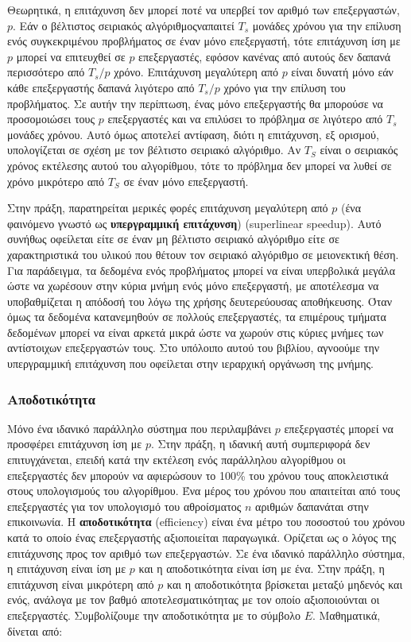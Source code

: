 \documentclass[12pt,a4paper]{article} %
\begin{document}
Θεωρητικά, η επιτάχυνση δεν μπορεί ποτέ να υπερβεί τον αριθμό των 
επεξεργαστών, $p$. Εάν ο βέλτιστος σειριακός αλγόριθμοςναπαιτεί $T_s$ 
μονάδες χρόνου για την επίλυση ενός συγκεκριμένου προβλήματος σε έναν 
μόνο επεξεργαστή, τότε επιτάχυνση ίση με $p$ μπορεί να επιτευχθεί σε $p$ 
επεξεργαστές, εφόσον κανένας από αυτούς δεν δαπανά περισσότερο από $T_s/p$ 
χρόνο. Επιτάχυνση μεγαλύτερη από $p$ είναι δυνατή μόνο εάν κάθε 
επεξεργαστής δαπανά λιγότερο από $T_s/p$ χρόνο για την επίλυση του 
προβλήματος. Σε αυτήν την περίπτωση, ένας μόνο επεξεργαστής θα μπορούσε 
να προσομοιώσει τους $p$ επεξεργαστές και να επιλύσει το πρόβλημα σε 
λιγότερο από $T_s$ μονάδες χρόνου. Αυτό όμως αποτελεί αντίφαση, διότι η
επιτάχυνση, εξ ορισμού, υπολογίζεται σε σχέση με τον βέλτιστο σειριακό 
αλγόριθμο. Αν $T_S$ είναι ο σειριακός χρόνος εκτέλεσης αυτού του αλγορίθμου, 
τότε το πρόβλημα δεν μπορεί να λυθεί σε χρόνο μικρότερο από $T_S$ σε έναν 
μόνο επεξεργαστή.

Στην πράξη, παρατηρείται μερικές φορές επιτάχυνση μεγαλύτερη από $p$ (ένα 
φαινόμενο γνωστό ως \textbf{υπεργραμμική επιτάχυνση}) 
({superlinear speedup}). Αυτό συνήθως οφείλεται 
είτε σε έναν μη βέλτιστο σειριακό αλγόριθμο είτε σε χαρακτηριστικά του 
υλικού που θέτουν τον σειριακό αλγόριθμο σε μειονεκτική θέση. Για 
παράδειγμα, τα δεδομένα ενός προβλήματος μπορεί να είναι υπερβολικά 
μεγάλα ώστε να χωρέσουν στην κύρια μνήμη ενός μόνο επεξεργαστή, με 
αποτέλεσμα να υποβαθμίζεται η απόδοσή του λόγω της χρήσης δευτερεύουσας 
αποθήκευσης. Όταν όμως τα δεδομένα κατανεμηθούν σε πολλούς επεξεργαστές, 
τα επιμέρους τμήματα δεδομένων μπορεί να είναι αρκετά μικρά ώστε να χωρούν 
στις κύριες μνήμες των αντίστοιχων επεξεργαστών τους. Στο υπόλοιπο αυτού 
του βιβλίου, αγνοούμε την υπεργραμμική επιτάχυνση που οφείλεται στην 
ιεραρχική οργάνωση της μνήμης.

\subsubsection{Αποδοτικότητα}
Μόνο ένα ιδανικό παράλληλο σύστημα που περιλαμβάνει $p$ επεξεργαστές 
μπορεί να προσφέρει επιτάχυνση ίση με $p$. Στην πράξη, η ιδανική αυτή 
συμπεριφορά δεν επιτυγχάνεται, επειδή κατά την εκτέλεση ενός παράλληλου 
αλγορίθμου οι επεξεργαστές δεν μπορούν να αφιερώσουν το 100\% του χρόνου 
τους αποκλειστικά στους υπολογισμούς του αλγορίθμου. Ένα μέρος του χρόνου 
που απαιτείται από τους επεξεργαστές για τον υπολογισμό του αθροίσματος $n$ 
αριθμών δαπανάται στην επικοινωνία. Η \textbf{αποδοτικότητα} 
({efficiency}) είναι ένα μέτρο του ποσοστού του 
χρόνου κατά το οποίο ένας επεξεργαστής αξιοποιείται παραγωγικά. Ορίζεται 
ως ο λόγος της επιτάχυνσης προς τον αριθμό των επεξεργαστών. Σε ένα ιδανικό 
παράλληλο σύστημα, η επιτάχυνση είναι ίση με $p$ και η αποδοτικότητα είναι 
ίση με ένα. Στην πράξη, η επιτάχυνση είναι μικρότερη από $p$ και η 
αποδοτικότητα βρίσκεται μεταξύ μηδενός και ενός, ανάλογα με τον βαθμό 
αποτελεσματικότητας με τον οποίο αξιοποιούνται οι επεξεργαστές. 
Συμβολίζουμε την αποδοτικότητα με το σύμβολο $E$. Μαθηματικά, δίνεται από:
\end{document}
